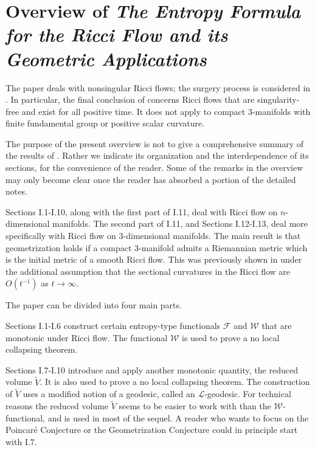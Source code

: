 \section{Overview of
 {\em The Entropy Formula for the Ricci
Flow and its Geometric
Applications}
\cite{Perelman}}
\label{overview1}

The paper \cite{Perelman} deals with nonsingular Ricci flows;
the surgery process is considered in \cite{Perelman2}.
In particular, the final conclusion of \cite{Perelman} concerns
Ricci flows that are singularity-free and exist for all positive time.
It does not apply
to compact $3$-manifolds with finite fundamental group or
positive scalar curvature.

The purpose of the present overview is not to give a comprehensive
summary of the results of \cite{Perelman}. Rather we indicate its
organization and the interdependence of its sections, for the
convenience of the reader.
Some of the remarks in the overview
may only become clear once the reader has absorbed
a portion of the detailed notes.

Sections I.1-I.10, along with the first part of I.11, deal with Ricci flow on
$n$-dimensional manifolds.  The second part of I.11, and Sections I.12-I.13, deal
more specifically with Ricci flow on $3$-dimensional manifolds.
The main result is that geometrization holds if a compact $3$-manifold
admits a Riemannian metric which is the initial metric of a smooth
Ricci flow.  This was previously shown in \cite{Hamiltonn} under the
additional assumption that the sectional curvatures in the Ricci flow
are $O(t^{-1})$ as $t \rightarrow \infty$.

The paper \cite{Perelman} can be divided into four main parts.

Sections I.1-I.6 construct
certain entropy-type functionals ${\mathcal F}$ and ${\mathcal W}$
that are monotonic under Ricci flow. The functional ${\mathcal W}$ is
used to prove a no local collapsing theorem.

Sections I.7-I.10 introduce and apply another monotonic quantity,
the reduced volume $\tilde{V}$. It is also used to prove a
no local collapsing theorem.  The construction of $\tilde{V}$ uses
a modified notion of a geodesic, called an ${\mathcal L}$-geodesic.
For technical reasons the reduced volume $\tilde{V}$ seems to be
easier to work with than the ${\mathcal W}$-functional, and is used
in most of the sequel.
A reader who wants to focus on the Poincar\'e Conjecture or the
Geometrization Conjecture could
in principle start with I.7.

